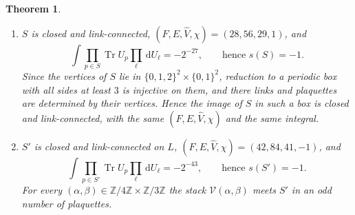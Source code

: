 \documentclass[11pt,a4paper]{amsart}
\newtheorem{theorem}{Theorem}[section]
\theoremstyle{definition}
\theoremstyle{remark}
\numberwithin{equation}{section}
\DeclareMathOperator{\Tr}{Tr}        %
\newcommand{\Z}{\mathbb{Z}}          %
\newcommand{\dd}{\,\mathrm{d}}             %
\begin{document}
\begin{theorem}\label{thm:surfaces}
\begin{enumerate}[label=\textup{(\alph*)},leftmargin=*]
\item $S$ is closed and link-connected, $(F,E,\hat V,\chi)=(28,56,29,1)$, and
\[
\int\prod_{p\in S}\Tr U_p\prod_\ell\dd U_\ell=-2^{-27},\qquad\text{hence } s(S)=-1.
\]
Since the vertices of $S$ lie in $\{0,1,2\}^2\times\{0,1\}^2$, reduction to a periodic box with all sides at least $3$ is injective on them, and there links and plaquettes are determined by their vertices. Hence the image of $S$ in such a box is closed and link-connected, with the same $(F,E,\hat V,\chi)$ and the same integral.
\item $S'$ is closed and link-connected on $L$, $(F,E,\hat V,\chi)=(42,84,41,-1)$, and
\[
\int\prod_{p\in S'}\Tr U_p\prod_\ell\dd U_\ell=-2^{-43},\qquad\text{hence } s(S')=-1.
\]
For every $(\alpha,\beta)\in\Z/4\Z\times\Z/3\Z$ the stack $\mathcal{V}(\alpha,\beta)$ meets $S'$ in an odd number of plaquettes.
\end{enumerate}
\end{theorem}
\end{document}
